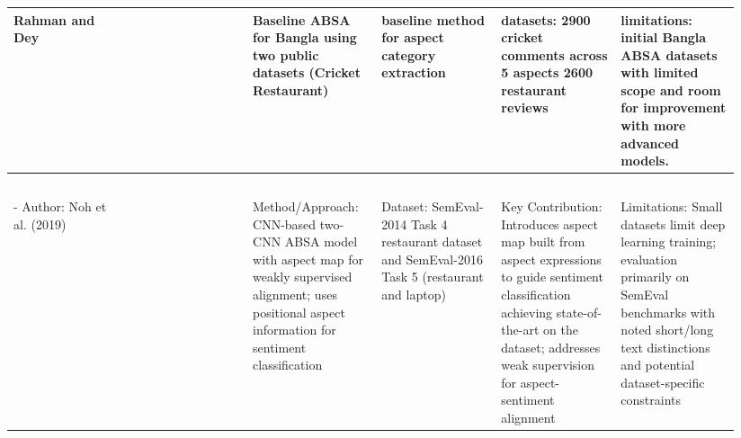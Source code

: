 \documentclass{article}
\begin{document}
\begin{landscape}
\begin{longtable}{p{0.157\linewidth} p{0.157\linewidth} p{0.157\linewidth} p{0.157\linewidth} p{0.157\linewidth} p{0.157\linewidth}}
Rahman and Dey & ~ & Baseline ABSA for Bangla using two public datasets (Cricket Restaurant) & baseline method for aspect category extraction & datasets: 2900 cricket comments across 5 aspects 2600 restaurant reviews & limitations: initial Bangla ABSA datasets with limited scope and room for improvement with more advanced models. \\ \hline
~ & ~ & ~ & ~ & ~ & ~ \\ \hline
- Author: Noh et al. (2019) & ~ & Method/Approach: CNN-based two-CNN ABSA model with aspect map for weakly supervised alignment; uses positional aspect information for sentiment classification & Dataset: SemEval-2014 Task 4 restaurant dataset and SemEval-2016 Task 5 (restaurant and laptop) & Key Contribution: Introduces aspect map built from aspect expressions to guide sentiment classification achieving state-of-the-art on the dataset; addresses weak supervision for aspect-sentiment alignment & Limitations: Small datasets limit deep learning training; evaluation primarily on SemEval benchmarks with noted short/long text distinctions and potential dataset-specific constraints \\ \hline

\end{longtable}
\end{landscape}
\end{document}
